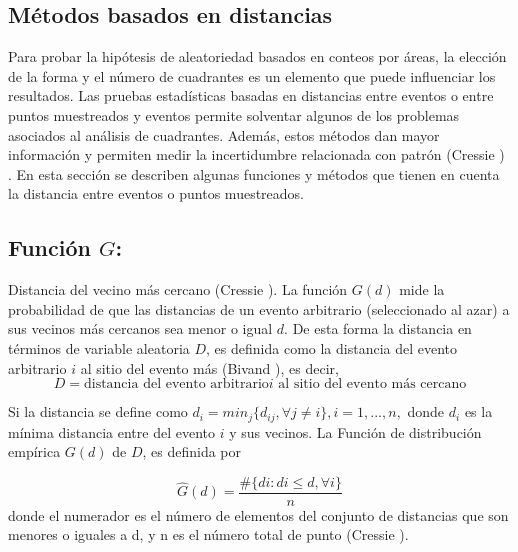 \documentclass[12pt]{report}
\begin{document}
			
		
		
		\subsection{Métodos basados en distancias}\label{funciones}  
		
		
		Para probar la hipótesis de aleatoriedad basados en conteos por áreas, la elección de la forma y el número de cuadrantes  es un elemento que puede influenciar los resultados. Las pruebas estadísticas basadas en distancias entre eventos o entre puntos muestreados 	y eventos  permite solventar algunos de los problemas asociados al análisis de cuadrantes. Además, estos métodos dan mayor información  y permiten medir la incertidumbre relacionada con patrón (Cressie \cite{Cress}) . En esta sección se describen algunas funciones y métodos que tienen en cuenta la distancia entre eventos o puntos muestreados. \\
		
			
		\subsection*{Función $G$:} Distancia del vecino más cercano (Cressie \cite{Cress}).  La función $G(d)$ mide la probabilidad de que las distancias de un evento arbitrario (seleccionado al azar)  a sus vecinos más cercanos sea menor o igual $d$. De esta forma la distancia en términos de variable aleatoria $ D $, es definida como la distancia del evento arbitrario $i$ al sitio del evento más (Bivand \cite{Roger}), es decir,		
		 \[ D = \text{distancia del evento arbitrario}  i  \text{ al sitio del evento más cercano} \]
		
		Si la distancia se define como $d_{i}= min_{j}\{d_{ij}, \forall j \neq i\},  i = 1, . . ., n, $  donde  $d_{i}$ es la mínima distancia entre del evento $ i$ y sus vecinos.  La Función de distribución empírica $G(d)$ de $D$,  es definida por  
		
		
		\[\widehat{G}(d) = \frac{\#\{di : di \leq d , \forall i \}}{n}\]  donde el numerador es el número de elementos del conjunto de distancias que son menores o iguales a d,  y n es el número total de punto (Cressie \cite{Cress}).\\
		
		
		
\end{document}
